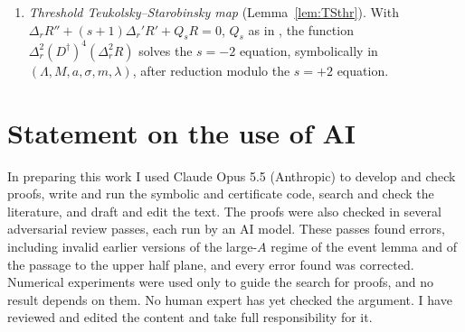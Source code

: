 \documentclass[11pt]{amsart}
\theoremstyle{definition}
\theoremstyle{remark}
\numberwithin{equation}{section}
\begin{document}
\begin{enumerate}[label=C\arabic*.,leftmargin=*]
evaluation of the unreduced polynomial on an interval enclosure of $b_+=2e_4v^2/(e_2v^2-\sqrt{Dv^4})$. The atlas is the
cube with projective blow-up charts at the faces $x=1$, $v=0$, $v=1$, $\tau=1$ and their intersections. Conditions:
(i) $L(t)$ at $m=1,2$ and its $m^2$-coefficient are positive where $2\delta\ge t-1$ (exact);
(ii) $2q_1^2\theta-1.05\,t(t-1)(-L(t))\ge0$ for $m=1,2$ and the $m^2$-coefficient, exactly outside $\{x,v\ge7/8\}$; inside,
(i) and $A\ge0$ reduce it to a quadratic inequality in $\tau$;
(iii), (iv) with the alternative ``$\varpi_m\le0$'' on each box; (v) on a single box.
\emph{Rounding.} Outside (i) and the exact part of (ii), coefficients are computed exactly, normalized, rounded once to
double precision, and subdivided by de Casteljau midpoints. Carrying alongside each array $A$ the array $B$ obtained by
the same subdivisions of $|A_{\rm root}|$, each entry satisfies $|A_{\rm float}-A_{\rm exact}|\le(1+u)^{1+\Sigma}u(1+\Sigma)B\le1.01\,u(1+\Sigma)B$ (as $u\Sigma<10^{-10}$),
where $u=2^{-53}$ and $\Sigma$ is the sum of the degrees subdivided. A sign is accepted only if $\pm A>10^{-13}(k+4)B$
entrywise at depth $k$; since all degrees are at most $122$, this exceeds the error bound by a factor of at least $7$.
\item \emph{Threshold Teukolsky--Starobinsky map} (Lemma~\ref{lem:TSthr}). With
$\Delta_rR''+(s+1)\Delta_r'R'+Q_sR=0$, $Q_s$ as in \cite{STU98}, the function $\Delta_r^2(D^\dagger)^4(\Delta_r^2R)$ solves
the $s=-2$ equation, symbolically in $(\Lambda,M,a,\sigma,m,\lambda)$, after reduction modulo the $s=+2$ equation.
\end{enumerate}

\section*{Statement on the use of AI}
In preparing this work I used Claude Opus 5.5 (Anthropic) to develop and check proofs, write and run the symbolic and
certificate code, search and check the literature, and draft and edit the text. The proofs were also checked in
several adversarial review passes, each run by an AI model. These passes found errors, including invalid earlier
versions of the large-$A$ regime of the event lemma and of the passage to the upper half plane, and every error found
was corrected. Numerical experiments were used only to guide the search for proofs, and no result depends on them.
No human expert has yet checked the argument. I have reviewed and edited the content and take full responsibility
for it.
\end{document}
